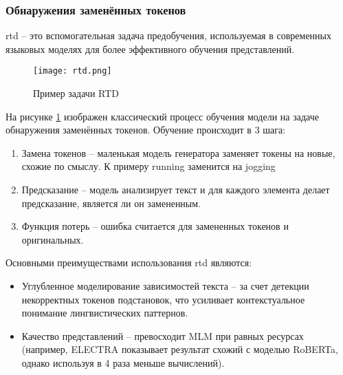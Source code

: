 \documentclass[../part_1.tex]{subfiles}
\begin{document}
\subsubsection{Обнаружения заменённых токенов}
\par \acrfull{rtd} -- это вспомогательная задача предобучения, используемая в современных языковых моделях для более эффективного обучения представлений. 

\begin{figure}[h]
    \centering
    \texttt{[image: rtd.png]}
    \caption{Пример задачи RTD}
    \label{fig:rtd_bert}
\end{figure}

\par На рисунке \ref{fig:rtd_bert} изображен классический процесс обучения модели на задаче обнаружения заменённых токенов. Обучение происходит в 3 шага:
\begin{enumerate}
    \item Замена токенов -- маленькая модель генератора заменяет токены на новые, схожие по смыслу. К примеру running заменится на jogging 
    \item Предсказание -- модель анализирует текст и для каждого элемента делает предсказание, является ли он замененным.
    \item Функция потерь -- ошибка считается для замененных токенов и оригинальных.
\end{enumerate}
\par Основными преимуществами использования \acrshort{rtd} являются:
\begin{itemize}
    \item Углубленное моделирование зависимостей текста -- за счет детекции некорректных токенов подстановок, что усиливает контекстуальное понимание лингвистических паттернов.
    \item Качество представлений -- превосходит MLM при равных ресурсах (например, ELECTRA\cite{clark2020electrapretrainingtextencoders} показывает результат схожий с моделью RoBERTa\cite{liu2019robertarobustlyoptimizedbert}, однако используя в 4 раза меньше вычислений).
\end{itemize}
\end{document}
